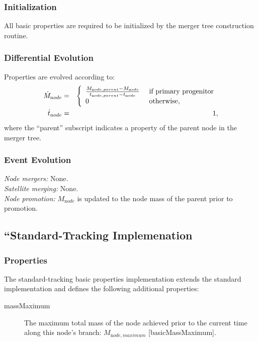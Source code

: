 \subsubsection{Initialization}

All basic properties are required to be initialized by the merger tree construction routine.

\subsubsection{Differential Evolution}

Properties are evolved according to:
\begin{eqnarray}
 \dot{M}_{\mathrm node} &=& \left\{\begin{array}{ll}{M_{\mathrm node, parent} - M_{\mathrm node} \over t_{\mathrm node, parent} - t_{\mathrm node}} & \hbox{ if primary progenitor} \\ 0 & \hbox{ otherwise}, \end{array} \right. \\
 \dot{t}_{\mathrm node} &=& 1,
\end{eqnarray}
where the ``parent'' subscript indicates a property of the parent \gls{node} in the merger tree.

\subsubsection{Event Evolution}

\noindent\emph{Node mergers:} None.\\

\noindent\emph{Satellite merging:} None.\\

\noindent\emph{Node promotion:} $M_{\mathrm node}$ is updated to the \gls{node} mass of the parent prior to promotion.\\

\subsection{``Standard-Tracking Implemenation}

\subsubsection{Properties}

The standard-tracking basic properties implementation extends the standard implementation and defines the following additional properties:
\begin{description}
 \item [{\normalfont \ttfamily massMaximum}] The maximum total mass of the node achieved prior to the current time along this node's branch: $M_{\mathrm node, maximum}$ [{\normalfont \ttfamily basicMassMaximum}].
\end{description}

